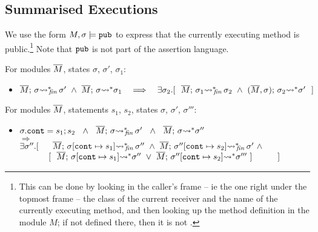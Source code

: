 {%
\subsection{Summarised Executions}

\begin{definition}
We use the form
$M, \sigma \models \mbox{\normalfont{\texttt{pub}}}$ to express that the currently executing method is public.\footnote{This can be done by looking in the caller's frame -- ie the one right under the topmost frame -- the class of the current receiver and the name of the currently executing method, and then looking up the method definition in the module $M$; if not defined there, then it is not . }
Note that $\mbox{\normalfont{\texttt{pub}}}$ is not part of the assertion language.
\end{definition}

 \begin{auxLemma}
 \label{lemma:encl:tem}
 For   modules $\overline{M}$,   states $\sigma$, $\sigma'$, $\sigma_1$:
\begin{itemize}
\item
$  \leadstoBoundedStarFin {\Mtwo}  {\sigma}  {\sigma'} \  \wedge \  \leadstoBoundedStar  {\Mtwo}  {\sigma}  {\sigma_1} 
\ \ \  \Longrightarrow\ \ \  %
 \exists \sigma_2.[\ \ \leadstoBoundedStarFin {\Mtwo} {\sigma_1}  {\sigma_2}  
\ \wedge\ 
\leadstoBoundedStarThree  {\Mtwo}  {\sigma_2}  {\sigma}   {\sigma'} \ \ ]$
\end{itemize}

\end{auxLemma} 

\begin{auxLemma}
\label{lemma:subexp}
For modules $\overline{M}$, statements $s_1$, $s_2$,  states $\sigma$, $\sigma'$, $\sigma'''$:
\begin{itemize}
\item
$ \sigma.\texttt{cont} = s_1; s_2 \ \ \wedge\ \  \leadstoBoundedStarFin {\Mtwo}  {\sigma}  {\sigma'}\ \ 
\wedge \ \
\leadstoBoundedStar {\Mtwo}  {\sigma}  {\sigma''}\
$\\
$  \Longrightarrow$\\
$   \exists \sigma''.[\ \ \ \ \   \leadstoBoundedStarFin {\Mtwo} {\sigma[\texttt{cont}\mapsto s_1]}  {\sigma''}  
\ \wedge\ 
\leadstoBoundedStarFin {\Mtwo} {\sigma''[\texttt{cont}\mapsto s_2]}   {\sigma'} \  \wedge$
\\
$\strut \hspace{1.2cm}  [ \ \ \overline{M};\, {\sigma[\texttt{cont}\mapsto s_1]} {\rightsquigarrow^*} \sigma''\ \vee \ \overline{M};\, {\sigma''[\texttt{cont}\mapsto s_2]} {\rightsquigarrow^*} \sigma'''\ ]\ \ \ \ \ \ \ \  \ ] $
\end{itemize}
\end{auxLemma}

}

